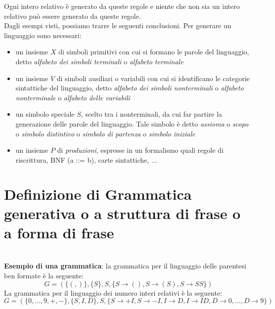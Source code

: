 \documentclass[12pt]{report}
\begin{document}
	Ogni intero relativo è generato da queste regole e niente che non sia un intero relativo può essere generato da queste regole. \\
	Dagli esempi visti, possiamo trarre le seguenti conclusioni. Per generare un linguaggio sono necessari:
	\begin{itemize}
			\item un insieme $X$ di simboli primitivi con cui si formano le parole del linguaggio, detto \textit{alfabeto dei simboli terminali} o \textit{alfabeto terminale}
			\item un insieme $V$ di simboli ausiliari o variabili con cui si identificano le categorie sintattiche del linguaggio, detto \textit{alfabeto dei simboli nonterminali} o \textit{alfabeto nonterminale} o \textit{alfabeto delle variabili}
			\item un simbolo speciale $S$, scelto tra i nonterminali, da cui far partire la generazione delle parole del linguaggio. Tale simbolo è detto \textit{assioma} o \textit{scopo} o \textit{simbolo distintivo} o \textit{simbolo di partenza} o \textit{simbolo iniziale}
			\item un insieme $P$ di \textit{produzioni}, espresse in un formalismo quali regole di riscrittura, BNF (a ::= b), carte sintattiche, ...
	\end{itemize}
	\section{Definizione di Grammatica generativa o a struttura di frase o a forma di frase}
	{
	} \\
	\textbf{Esempio di una grammatica}: la grammatica per il linguaggio delle parentesi ben formate è la seguente:
	\[
	G = (\{(,)\}, \{S\}, S, \{S \to (), S \to (S), S \to SS\})
	\]
	La grammatica per il linguaggio dei numero interi relativi è la seguente:
	\[
	G = (\{0, \dots, 9, +, -\}, \{S, I, D\}, S, \{S \to +I, S \to -I, I \to D, I \to ID, D \to 0, \dots, D \to 9\})
	\]
\end{document}
